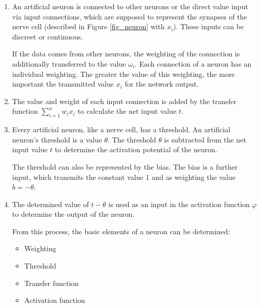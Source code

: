\begin{enumerate}

  \item An artificial neuron is connected to other neurons
        or the direct value input via input connections,
        which are supposed to represent the synapses of the
        nerve cell (described in Figure \ref{fig_neuron}
        with $x_i$). These inputs can be discreet or
        continuous.\cite{nne_beck}

        If the data comes from other neurons, the weighting
         of the connection
        is additionally transferred to the value
        $\omega_i$. Each connection of a neuron has an
        individual weighting. The greater the value
        of this weighting, the more important the
        transmitted value $x_i$ for the network output.

  \item The value and weight of each input connection is
        added by the transfer function $\sum_{i=1}^{n}w_ix_i$
        to calculate the net input value $t$.


  \item Every artificial neuron, like a nerve cell, has a
        threshold. An artificial neuron's threshold is a
        value $\theta$.
        The threshold $\theta$ is subtracted from the net
        input value $t$ to determine the activation
        potential of the neuron.

        The threshold can also be represented by the bias.
        The bias is a further
        input, which transmits the constant value 1 and as
        weighting the value $b=-\theta$.

        

  \item The determined value of $t-\theta$ is used as an
        input in the activation function $\varphi$ to
        determine the output of the neuron.

        From this process, the basic elements of a neuron
        can be determined:

        \begin{itemize}

          \item Weighting

          \item Threshold

          \item Transfer function

          \item Activation function

        \end{itemize}

\end{enumerate}

